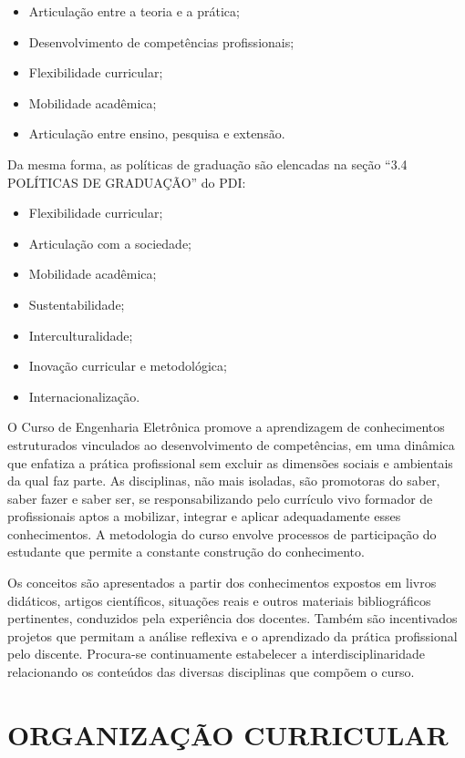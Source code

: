\begin{itemize}
	\item Articulação entre a teoria e a prática;
	\item Desenvolvimento de competências profissionais;
	\item Flexibilidade curricular;
	\item Mobilidade acadêmica;
	\item Articulação entre ensino, pesquisa e extensão.
\end{itemize}

Da mesma forma, as políticas de graduação são elencadas na seção ``3.4 POLÍTICAS DE GRADUAÇÃO'' do PDI:

\begin{itemize}
	\item Flexibilidade curricular;
	\item Articulação com a sociedade;
	\item Mobilidade acadêmica;
	\item Sustentabilidade;
	\item Interculturalidade;
	\item Inovação curricular e metodológica;
	\item Internacionalização.
\end{itemize}

O Curso de Engenharia Eletrônica promove a aprendizagem de conhecimentos estruturados vinculados ao desenvolvimento de competências, em uma dinâmica que enfatiza a prática profissional sem excluir as dimensões sociais e ambientais da qual faz parte. As disciplinas, não mais isoladas, são promotoras do saber, saber fazer e saber ser, se responsabilizando pelo currículo vivo formador de profissionais aptos a mobilizar, integrar e aplicar adequadamente esses conhecimentos. A metodologia do curso envolve processos de participação do estudante que permite a constante construção do conhecimento.

Os conceitos são apresentados a partir dos conhecimentos expostos em livros didáticos, artigos científicos, situações reais e outros materiais bibliográficos pertinentes, conduzidos pela experiência dos docentes. Também são incentivados projetos que permitam a análise reflexiva e o aprendizado da prática profissional pelo discente. Procura-se continuamente estabelecer a interdisciplinaridade relacionando os conteúdos das diversas disciplinas que compõem o curso.

\section{ORGANIZAÇÃO CURRICULAR}

